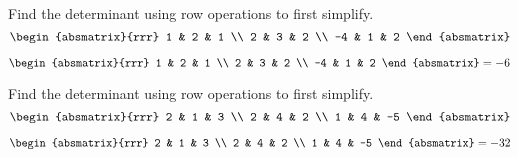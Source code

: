\begin{enumialphparenastyle}

\begin{ex} Find the determinant using row operations to first simplify. 
\begin{equation*}
\begin{absmatrix}{rrr}
1 & 2 & 1 \\
2 & 3 & 2 \\
-4 & 1 & 2
\end{absmatrix}
\end{equation*}
\begin{sol}
\[
\begin{absmatrix}{rrr}
1 & 2 & 1 \\
2 & 3 & 2 \\
-4 & 1 & 2
\end{absmatrix} = -6
\]
\end{sol}
\end{ex}

\begin{ex} Find the determinant using row operations to first simplify.
\begin{equation*}
\begin{absmatrix}{rrr}
2 & 1 & 3 \\
2 & 4 & 2 \\
1 & 4 & -5
\end{absmatrix}
\end{equation*}
\begin{sol}
\[
\begin{absmatrix}{rrr}
2 & 1 & 3 \\
2 & 4 & 2 \\
1 & 4 & -5
\end{absmatrix} = -32
\]
\end{sol}
\end{ex}


\end{enumialphparenastyle}
